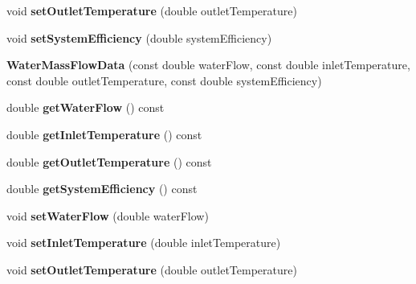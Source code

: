 \begin{DoxyCompactItemize}
void {\bfseries set\+Outlet\+Temperature} (double outlet\+Temperature)
\item 
\mbox{\label{class_water_mass_flow_data_a19752c6a0e1c7b8af48b4add34f82bcb}} 
void {\bfseries set\+System\+Efficiency} (double system\+Efficiency)
\item 
\mbox{\label{class_water_mass_flow_data_a7224fde8b1fa5ad72b33795a2c2fb032}} 
{\bfseries Water\+Mass\+Flow\+Data} (const double water\+Flow, const double inlet\+Temperature, const double outlet\+Temperature, const double system\+Efficiency)
\item 
\mbox{\label{class_water_mass_flow_data_adec24638b0b661c67c2078cf7baa1113}} 
double {\bfseries get\+Water\+Flow} () const
\item 
\mbox{\label{class_water_mass_flow_data_a1b5b0531d88499b941a7347bd448ddd3}} 
double {\bfseries get\+Inlet\+Temperature} () const
\item 
\mbox{\label{class_water_mass_flow_data_a58591a852d7d7ab0078294e87b8404ef}} 
double {\bfseries get\+Outlet\+Temperature} () const
\item 
\mbox{\label{class_water_mass_flow_data_a7381a249fbb481b9cd0ba5f6874e465e}} 
double {\bfseries get\+System\+Efficiency} () const
\item 
\mbox{\label{class_water_mass_flow_data_a996ab40468abb603ab06cf5cd604e12e}} 
void {\bfseries set\+Water\+Flow} (double water\+Flow)
\item 
\mbox{\label{class_water_mass_flow_data_a611f30a017ca72900d37b67ad4ce770a}} 
void {\bfseries set\+Inlet\+Temperature} (double inlet\+Temperature)
\item 
\mbox{\label{class_water_mass_flow_data_a5dbf48f498de988696075c313e2b0cbb}} 
void {\bfseries set\+Outlet\+Temperature} (double outlet\+Temperature)
\item 
\mbox{\label{class_water_mass_flow_data_a19752c6a0e1c7b8af48b4add34f82bcb}} 

\end{DoxyCompactItemize}
